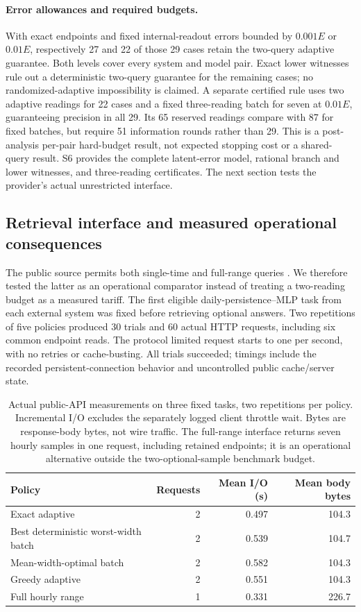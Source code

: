\documentclass[12pt]{article}
\begin{document}
\paragraph{Error allowances and required budgets.}
\label{sec:stored-error-sensitivity}
With exact endpoints and fixed internal-readout errors bounded by
$0.001E$ or $0.01E$, respectively 27 and 22 of those 29 cases retain the
two-query adaptive guarantee. Both levels cover every system and model
pair. Exact lower witnesses rule out a deterministic two-query guarantee
for the remaining cases; no randomized-adaptive impossibility is claimed.
A separate certified rule uses two adaptive readings for 22 cases and a
fixed three-reading batch for seven at $0.01E$, guaranteeing precision in
all 29. Its 65 reserved readings compare with 87 for fixed batches, but
require 51 information rounds rather than 29. This is a post-analysis
per-pair hard-budget result, not expected stopping cost or a shared-query
result. S6 provides the complete latent-error model, rational branch and
lower witnesses, and three-reading certificates. The next section tests
the provider's actual unrestricted interface.

\subsection{Retrieval interface and measured operational consequences}
\label{sec:actual-api}
The public source permits both single-time and full-range queries
\citep{hpmapi,hpmcode}. We therefore tested the latter as an operational
comparator instead of treating a two-reading budget as a measured tariff.
The first eligible daily-persistence--MLP task from each external system
was fixed before retrieving optional answers. Two repetitions of five
policies produced 30 trials and 60 actual HTTP requests, including six
common endpoint reads. The protocol limited request starts to one per
second, with no retries or cache-busting. All trials succeeded; timings
include the recorded persistent-connection behavior and uncontrolled
public cache/server state.

\begin{table}[htbp]\centering\small
\caption{Actual public-API measurements on three fixed tasks, two
repetitions per policy. Incremental I/O excludes the separately logged
client throttle wait. Bytes are response-body bytes, not wire traffic.
The full-range interface returns seven hourly samples in one request,
including retained endpoints; it is an operational alternative outside
the two-optional-sample benchmark budget.}\label{tab:actual-api}
\begin{tabular}{lrrr}\toprule
Policy & Requests & Mean I/O (s) & Mean body bytes\\\midrule
Exact adaptive & 2 & 0.497 & 104.3\\
Best deterministic worst-width batch & 2 & 0.539 & 104.7\\
Mean-width-optimal batch & 2 & 0.582 & 104.3\\
Greedy adaptive & 2 & 0.551 & 104.3\\
Full hourly range & 1 & 0.331 & 226.7\\\bottomrule
\end{tabular}\end{table}
\end{document}
